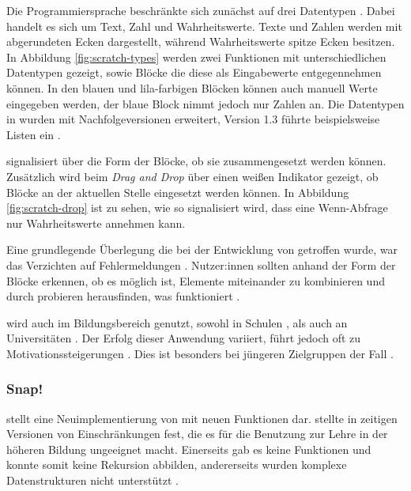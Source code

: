 Die Programmiersprache \Scratch{} beschränkte sich zunächst auf drei Datentypen \parencite{maloneyScratchProgramming2010}. Dabei handelt es sich um Text, Zahl und Wahrheitswerte. Texte und Zahlen werden mit abgerundeten Ecken dargestellt, während Wahrheitswerte spitze Ecken besitzen. In Abbildung \ref{fig:scratch-types} werden zwei Funktionen mit unterschiedlichen Datentypen gezeigt, sowie Blöcke die diese als Eingabewerte entgegennehmen können. In den blauen und lila-farbigen Blöcken können auch manuell Werte eingegeben werden, der blaue Block nimmt jedoch nur Zahlen an. Die Datentypen in \Scratch{} wurden mit Nachfolgeversionen erweitert, Version 1.3 führte beispielsweise Listen ein \parencite{harveyBringingNo2010}.

\Scratch{} signalisiert über die Form der Blöcke, ob sie zusammengesetzt werden können. Zusätzlich wird beim \textit{Drag and Drop} über einen weißen Indikator gezeigt, ob Blöcke an der aktuellen Stelle eingesetzt werden können. In Abbildung \ref{fig:scratch-drop} ist zu sehen, wie so signalisiert wird, dass eine Wenn-Abfrage nur Wahrheitswerte annehmen kann.

Eine grundlegende Überlegung die bei der Entwicklung von \Scratch{} getroffen wurde, war das Verzichten auf Fehlermeldungen \parencite{maloneyScratchProgramming2010}. Nutzer:innen sollten anhand der Form der Blöcke erkennen, ob es möglich ist, Elemente miteinander zu kombinieren und durch probieren herausfinden, was funktioniert \parencite{maloneyScratchProgramming2010}.

\Scratch{} wird auch im Bildungsbereich genutzt, sowohl in Schulen \parencite{ortiz-colonTeachingScratch2016}, als auch an Universitäten \parencite{dekerekiScratchApplications2008}. Der Erfolg dieser Anwendung variiert, führt jedoch oft zu Motivationssteigerungen \parencite{dekerekiScratchApplications2008, martinez-valdesRelativelyUnsatisfactory2017}. Dies ist besonders bei jüngeren Zielgruppen der Fall \parencite{ortiz-colonTeachingScratch2016}.

\subsubsection{Snap!}
\Snap{} stellt eine Neuimplementierung von \Scratch{} mit neuen Funktionen dar. \textcite{harveyBringingNo2010} stellte in zeitigen Versionen von \Scratch{} Einschränkungen fest, die es für die Benutzung zur Lehre in der höheren Bildung ungeeignet macht. Einerseits gab es keine Funktionen und konnte somit keine Rekursion abbilden, andererseits wurden komplexe Datenstrukturen nicht unterstützt \parencite{harveyBringingNo2010}.

